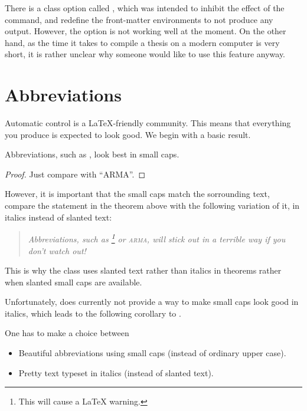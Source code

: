 There is a class option called , which was intended to inhibit the effect of the  command, and redefine the front-matter environments to not produce any output.  However, the option is not working well at the moment.  On the other hand, as the time it takes to compile a thesis on a modern computer is very short, it is rather unclear why someone would like to use this feature anyway.


\section{Abbreviations}

Automatic control is a \LaTeX{}-friendly community.  This means that everything you produce is expected to look good.  We begin with a basic result.

\begin{theorem}\label{th:abbr-in-sc}
  Abbreviations, such as \abbrARMA, look best in small caps.

  \begin{proof}
    Just compare with “ARMA”.
  \end{proof}
\end{theorem}

However, it is important that the small caps match the sorrounding text, compare the statement in the theorem above with the following variation of it, in italics instead of slanted text:
\begin{quotation}
  \noindent\textit{Abbreviations, such as \abbrARMA\footnote{This will cause a \LaTeX{} warning.} or {\normalfont\textsc{arma}}, will stick out in a terrible way if you don't watch out!}
\end{quotation}
This is why the \rtthesis class uses slanted text rather than italics in theorems rather when slanted small caps are available.

Unfortunately, \rtthesis does currently not provide a way to make small caps look good in italics, which leads to the following corollary to .

\begin{corollary}
  One has to make a choice between
  \begin{itemize}
  \item Beautiful abbreviations using small caps (instead of ordinary upper case).
  \item Pretty text typeset in italics (instead of slanted text).
  \end{itemize}
\end{corollary}


